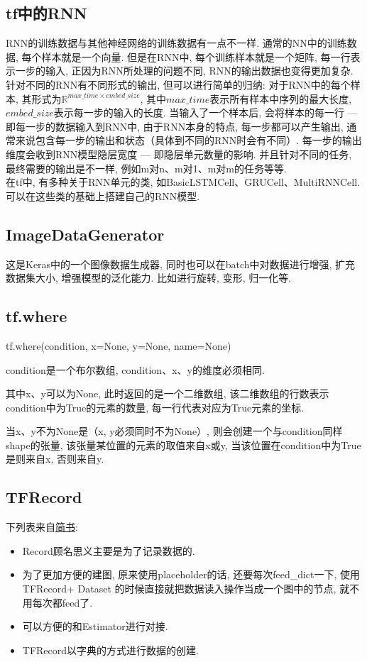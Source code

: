\subsection{tf中的RNN}RNN的训练数据与其他神经网络的训练数据有一点不一样. 通常的NN中的训练数据, 每个样本就是一个向量. 但是在RNN中, 每个训练样本就是一个矩阵, 每一行表示一步的输入, 正因为RNN所处理的问题不同, RNN的输出数据也变得更加复杂. \\
针对不同的RNN有不同形式的输出, 但可以进行简单的归纳: 对于RNN中的每个样本, 其形式为$\mathbb{R}^{max\_time \times embed\_size}$, 其中$max\_time$表示所有样本中序列的最大长度, $embed\_size$表示每一步的输入的长度. 当输入了一个样本后, 会将样本的每一行 --- 即每一步的数据输入到RNN中, 由于RNN本身的特点, 每一步都可以产生输出, 通常来说包含每一步的输出和状态（具体到不同的RNN时会有不同）. 每一步的输出维度会收到RNN模型隐层宽度 --- 即隐层单元数量的影响. 并且针对不同的任务, 最终需要的输出是不一样, 例如m对n、m对1、m对m的任务等等. \\
在tf中, 有多种关于RNN单元的类, 如BasicLSTMCell、GRUCell、MultiRNNCell. 可以在这些类的基础上搭建自己的RNN模型. 


\subsection{ImageDataGenerator}
这是Keras中的一个图像数据生成器, 同时也可以在batch中对数据进行增强, 扩充数据集大小, 增强模型的泛化能力. 比如进行旋转, 变形, 归一化等. 

\subsection{tf.where}
tf.where(condition, x=None, y=None, name=None)

condition是一个布尔数组, condition、x、y的维度必须相同. 

其中x、y可以为None, 此时返回的是一个二维数组, 该二维数组的行数表示condition中为True的元素的数量, 每一行代表对应为True元素的坐标. 

当x、y不为None是（x, y必须同时不为None）, 则会创建一个与condition同样shape的张量, 该张量某位置的元素的取值来自x或y, 当该位置在condition中为True是则来自x, 否则来自y. 


\subsection{TFRecord}
下列表来自\href{https://www.jianshu.com/p/72596a8488c3}{简书}: 
\begin{itemize}
	\item Record顾名思义主要是为了记录数据的. 
	\item 为了更加方便的建图, 原来使用placeholder的话, 还要每次feed\_dict一下, 使用TFRecord+ Dataset 的时候直接就把数据读入操作当成一个图中的节点, 就不用每次都feed了. 
	\item 可以方便的和Estimator进行对接. 
	\item TFRecord以字典的方式进行数据的创建. 
\end{itemize}


